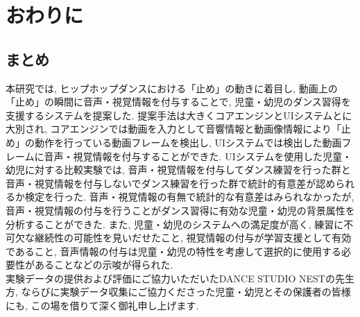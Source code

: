 \documentclass[technicalreport]{ieicej}
\begin{document}
\section{おわりに}
\subsection{まとめ}
本研究では, ヒップホップダンスにおける「止め」の動きに着目し, 動画上の「止め」の瞬間に音声・視覚情報を付与することで, 児童・幼児のダンス習得を支援するシステムを提案した. 提案手法は大きくコアエンジンとUIシステムとに大別され, コアエンジンでは動画を入力として音響情報と動画像情報により「止め」の動作を行っている動画フレームを検出し, UIシステムでは検出した動画フレームに音声・視覚情報を付与することができた. UIシステムを使用した児童・幼児に対する比較実験では, 音声・視覚情報を付与してダンス練習を行った群と音声・視覚情報を付与しないでダンス練習を行った群で統計的有意差が認められるか検定を行った. 音声・視覚情報の有無で統計的な有意差はみられなかったが, 音声・視覚情報の付与を行うことがダンス習得に有効な児童・幼児の背景属性を分析することができた. また, 児童・幼児のシステムへの満足度が高く, 練習に不可欠な継続性の可能性を見いだせたこと, 視覚情報の付与が学習支援として有効であること, 音声情報の付与は児童・幼児の特性を考慮して選択的に使用する必要性があることなどの示唆が得られた.\\

\ack %
実験データの提供および評価にご協力いただいたDANCE STUDIO NESTの先生方, ならびに実験データ収集にご協力くださった児童・幼児とその保護者の皆様にも, この場を借りて深く御礼申し上げます. \\





\end{document}
